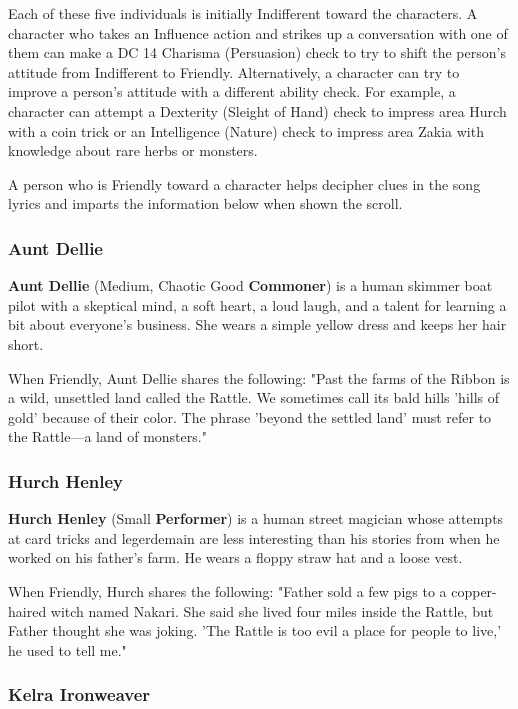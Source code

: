 \documentclass[letterpaper, 11pt, twocolumn]{dndbook}
\begin{document}
Each of these five individuals is initially Indifferent toward the characters. A character who takes an Influence action and strikes up a conversation with one of them can make a DC 14 Charisma (Persuasion) check to try to shift the person's attitude from Indifferent to Friendly. Alternatively, a character can try to improve a person's attitude with a different ability check. For example, a character can attempt a Dexterity (Sleight of Hand) check to impress area Hurch with a coin trick or an Intelligence (Nature) check to impress area Zakia with knowledge about rare herbs or monsters.

A person who is Friendly toward a character helps decipher clues in the song lyrics and imparts the information below when shown the scroll.

\subsubsection{Aunt Dellie}

\textbf{Aunt Dellie} (Medium, Chaotic Good \textbf{Commoner}) is a human skimmer boat pilot with a skeptical mind, a soft heart, a loud laugh, and a talent for learning a bit about everyone's business. She wears a simple yellow dress and keeps her hair short.

When Friendly, Aunt Dellie shares the following: "Past the farms of the Ribbon is a wild, unsettled land called the Rattle. We sometimes call its bald hills 'hills of gold' because of their color. The phrase 'beyond the settled land' must refer to the Rattle---a land of monsters."

\subsubsection{Hurch Henley}

\textbf{Hurch Henley} (Small \textbf{Performer}) is a human street magician whose attempts at card tricks and legerdemain are less interesting than his stories from when he worked on his father's farm. He wears a floppy straw hat and a loose vest.

When Friendly, Hurch shares the following: "Father sold a few pigs to a copper-haired witch named Nakari. She said she lived four miles inside the Rattle, but Father thought she was joking. 'The Rattle is too evil a place for people to live,' he used to tell me."

\subsubsection{Kelra Ironweaver}
\end{document}
